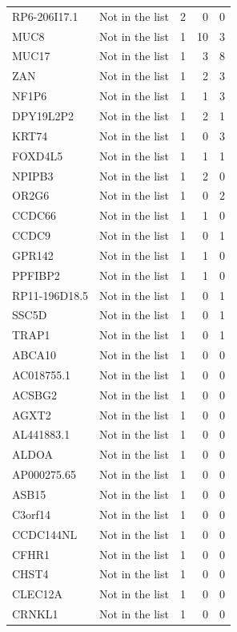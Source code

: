 \documentclass[12pt,twoside]{reedthesis}
\theoremstyle{definition}
\theoremstyle{definition}
\theoremstyle{remark}
\begin{document}
\begin{longtable}[t]{llrrr}
  RP6-206I17.1 & Not in the list & 2 & 0 & 0\\
  \addlinespace
  MUC8 & Not in the list & 1 & 10 & 3\\
  MUC17 & Not in the list & 1 & 3 & 8\\
  ZAN & Not in the list & 1 & 2 & 3\\
  NF1P6 & Not in the list & 1 & 1 & 3\\
  DPY19L2P2 & Not in the list & 1 & 2 & 1\\
  \addlinespace
  KRT74 & Not in the list & 1 & 0 & 3\\
  FOXD4L5 & Not in the list & 1 & 1 & 1\\
  NPIPB3 & Not in the list & 1 & 2 & 0\\
  OR2G6 & Not in the list & 1 & 0 & 2\\
  CCDC66 & Not in the list & 1 & 1 & 0\\
  \addlinespace
  CCDC9 & Not in the list & 1 & 0 & 1\\
  GPR142 & Not in the list & 1 & 1 & 0\\
  PPFIBP2 & Not in the list & 1 & 1 & 0\\
  RP11-196D18.5 & Not in the list & 1 & 0 & 1\\
  SSC5D & Not in the list & 1 & 0 & 1\\
  \addlinespace
  TRAP1 & Not in the list & 1 & 0 & 1\\
  ABCA10 & Not in the list & 1 & 0 & 0\\
  AC018755.1 & Not in the list & 1 & 0 & 0\\
  ACSBG2 & Not in the list & 1 & 0 & 0\\
  AGXT2 & Not in the list & 1 & 0 & 0\\
  \addlinespace
  AL441883.1 & Not in the list & 1 & 0 & 0\\
  ALDOA & Not in the list & 1 & 0 & 0\\
  AP000275.65 & Not in the list & 1 & 0 & 0\\
  ASB15 & Not in the list & 1 & 0 & 0\\
  C3orf14 & Not in the list & 1 & 0 & 0\\
  \addlinespace
  CCDC144NL & Not in the list & 1 & 0 & 0\\
  CFHR1 & Not in the list & 1 & 0 & 0\\
  CHST4 & Not in the list & 1 & 0 & 0\\
  CLEC12A & Not in the list & 1 & 0 & 0\\
  CRNKL1 & Not in the list & 1 & 0 & 0\\

\end{longtable}
\end{document}
